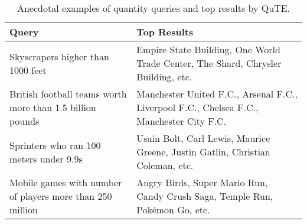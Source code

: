 \begin{table*}[t]
	\caption{Anecdotal examples of quantity queries and top results by QuTE.}	
	\small	
	\vspace{\tsq}
	\begin{tabular}{l|l} 	 
				    \hline
		Query & Top Results \\    \hline
		Skyscrapers higher than 1000 feet & Empire State Building, One World Trade Center, The Shard, Chrysler Building, etc. \\ 
    British football teams worth more than 1.5 billion pounds & Manchester United F.C., Arsenal F.C., Liverpool F.C., Chelsea F.C., Manchester City F.C.\\  
		 Sprinters who ran 100 meters under 9.9s & Usain Bolt, Carl Lewis, Maurice Greene,  Justin Gatlin,	Christian Coleman, etc.  \\  

		Mobile games with number of players more than 250 million & Angry Birds, Super Mario Run, Candy Crush Saga, Temple Run, Pok\'{e}mon Go, etc. \\ 

			    \hline
	\end{tabular}	
	\label{table:example_qa}
\end{table*}